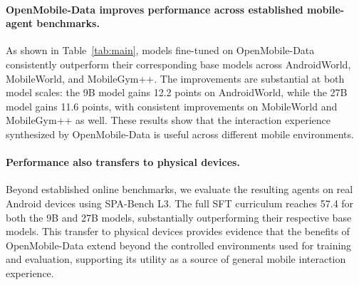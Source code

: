 
\paragraph{OpenMobile-Data improves performance across established mobile-agent benchmarks.}
As shown in Table~\ref{tab:main}, models fine-tuned on OpenMobile-Data consistently outperform their corresponding base models across AndroidWorld, MobileWorld, and MobileGym++. The improvements are substantial at both model scales: the 9B model gains 12.2 points on AndroidWorld, while the 27B model gains 11.6 points, with consistent improvements on MobileWorld and MobileGym++ as well. These results show that the interaction experience synthesized by OpenMobile-Data is useful across different mobile environments.

\paragraph{Performance also transfers to physical devices.}
Beyond established online benchmarks, we evaluate the resulting agents on real Android devices using SPA-Bench L3. The full SFT curriculum reaches 57.4 for both the 9B and 27B models, substantially outperforming their respective base models. This transfer to physical devices provides evidence that the benefits of OpenMobile-Data extend beyond the controlled environments used for training and evaluation, supporting its utility as a source of general mobile interaction experience.

